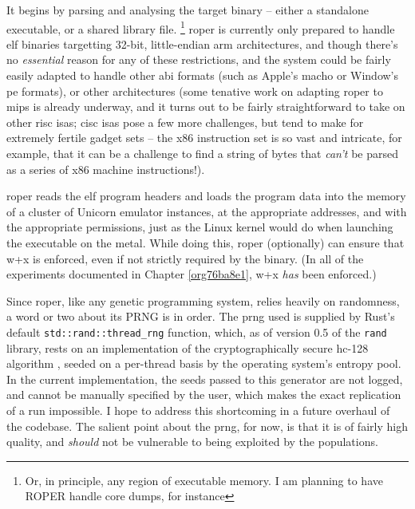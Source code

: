 \documentclass[12pt,glossary]{dalthesis}
\begin{document}
It begins by parsing and analysing the target binary -- either a standalone
executable, or a shared library file. \footnote{Or, in principle, any region of
executable memory. I am planning to have ROPER handle core dumps, for instance}   \Gls{roper} is currently 
only prepared to handle \gls{elf} binaries targetting 32-bit, little-endian
\gls{arm} architectures, and though there's no \emph{essential} reason for any of these
restrictions, and the system could be fairly easily adapted to handle other
\gls{abi} formats (such as Apple's \gls{macho} or Window's \gls{pe} formats), or
other architectures (some tenative work on adapting \gls{roper} to \gls{mips}
is already underway, and it turns out to be fairly straightforward to 
take on other \gls{risc} \glspl{isa}; \gls{cisc} \glspl{isa} pose a few more
challenges, but tend to make for extremely fertile gadget sets -- the
\gls{x86} instruction set is so vast and intricate, for example, that
it can be a challenge to find a string of bytes that \emph{can't} be parsed
as a series of \gls{x86} machine instructions!). 

\Gls{roper} reads the \gls{elf} program headers and loads the program data into the
memory of a cluster of Unicorn emulator instances, at the appropriate addresses,
and with the appropriate permissions, just as the Linux kernel would do when
launching the executable on the metal. While doing this, \gls{roper} (optionally)
can ensure that \gls{w+x} is enforced, even if not strictly required by the
binary. (In all of the experiments documented in Chapter \ref{org76ba8e1},
\gls{w+x} \emph{has} been enforced.)

Since \gls{roper}, like any genetic programming system, relies heavily on
randomness, a word or two about its \gls{PRNG} is in order. The \gls{prng}
used is supplied by Rust's default \texttt{std::rand::thread\_rng} function, which,
as of version 0.5 of the \texttt{rand} library, rests on an implementation of
the cryptographically secure \gls{hc-128} algorithm \cite{wu08}, seeded on a per-thread
basis by the operating system's entropy pool. In the current implementation,
the seeds passed to this generator are not logged, and cannot be manually specified
by the user, which makes the exact replication of a run impossible. I hope to
address this shortcoming in a future overhaul of the codebase. The salient point
about the \gls{prng}, for now, is that it is of fairly high quality, and \emph{should}
not be vulnerable to being exploited by the populations. 
\end{document}
